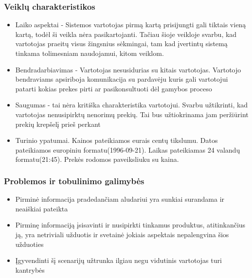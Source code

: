 \documentclass[oneside]{VUMIFPSkursinis}
\begin{document}
		\subsubsection{Veiklų charakteristikos}
			\begin{itemize}
				\item{Laiko aspektai - Sistemos vartotojas pirmą kartą prisijungti gali tiktais vieną kartą, todėl ši veikla nėra pasikartojanti.
					Tačiau šioje veikloje svarbu, kad vartotojas praeitų visus žingsnius sėkmingai, tam kad įvertintų sistemą tinkama tolimesniam naudojamui, kitom veiklom. }
				\item{Bendradarbiavimas - Vartotojas nesusidurias su kitais vartotojas.
					Vartotojo bendraviams apsiriboja komunikacija su pardavėju kuris gali vartotojui patarti kokias prekes pirti ar pasikonsultuoti dėl gamybos proceso}
				\item{Saugumas - tai nėra kritiška charakteristika vartotojui.
					Svarbu užtikrinti, kad vartotojas nenusipirktų nenorimų prekių.
					Tai bus užtiokrinama jam peržiūrint prekių krepšelį prieš perkant}
				\item{Turinio ypatumai.}
					Kainos pateikiamos eurais centų tikslumu.
					Datos pateikiamos europiniu formatu(1996-09-21).
					Laikas pateikiamas 24 valandų formatu(21:45).
					Prekės rodomos paveiksliuku su kaina.
			\end{itemize}
		\subsubsection{Problemos ir tobulinimo galimybės}
			\begin{itemize}
				\item{Pirminė informacija pradedančiam aludariui yra sunkiai surandama ir neaiškiai pateikta}
 				\item{Pirminę informaciją įsisavinti ir nusipirkti tinkamus produktus, atitinkančius ją, yra netriviali užduotis ir svetainė jokiais aspektais nepalengvina šios užduoties}
 				\item{Įgyvendinti šį scenarijų užtrunka ilgiau negu vidutinis vartotojas turi kantrybės}
			\end{itemize}
\end{document}
